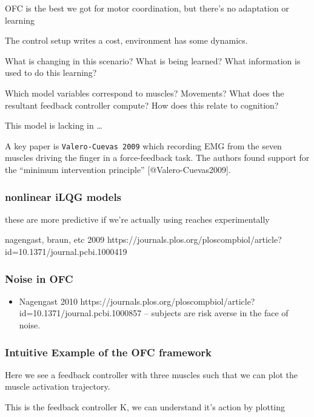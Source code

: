 \documentclass[../main.tex]{subfiles}
\begin{document}
OFC is the best we got for motor coordination, but there's no adaptation
or learning

The control setup writes a cost, environment has some dynamics.

What is changing in this scenario? What is being learned? What
information is used to do this learning?

Which model variables correspond to muscles? Movements? What does the
resultant feedback controller compute? How does this relate to
cognition?

This model is lacking in \ldots{}

A key paper is \texttt{Valero-Cuevas\ 2009} which recording EMG from the
seven muscles driving the finger in a force-feedback task. The authors
found support for the ``minimum intervention principle''
{[}@Valero-Cuevas2009{]}.

\subsubsection{nonlinear iLQG models}\label{nonlinear-ilqg-models}

these are more predictive if we're actually using reaches experimentally

nagengast, braun, etc 2009
https://journals.plos.org/ploscompbiol/article?id=10.1371/journal.pcbi.1000419

\subsubsection{Noise in OFC}\label{noise-in-ofc}

\begin{itemize}
\tightlist
\item
  Nagengast 2010
  https://journals.plos.org/ploscompbiol/article?id=10.1371/journal.pcbi.1000857
  -- subjects are risk averse in the face of noise.
\end{itemize}

\subsubsection{Intuitive Example of the OFC
framework}\label{intuitive-example-of-the-ofc-framework}

Here we see a feedback controller with three muscles such that we can
plot the muscle activation trajectory.

This is the feedback controller K, we can understand it's action by
plotting
\end{document}
